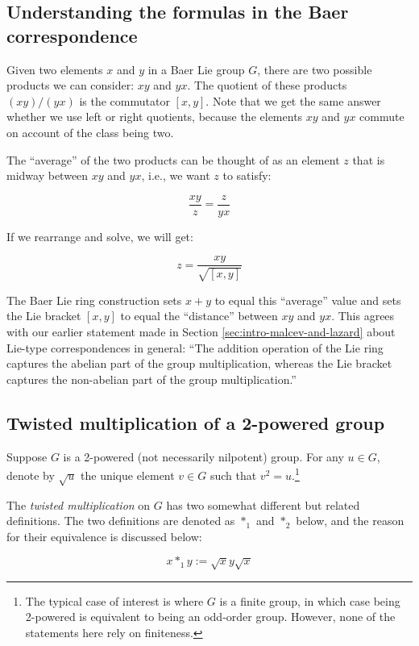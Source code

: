 \subsection{Understanding the formulas in the Baer correspondence}\label{sec:mean-deviation}

Given two elements $x$ and $y$ in a Baer Lie group $G$, there are two
possible products we can consider: $xy$ and $yx$. The quotient of
these products $(xy)/(yx)$ is the commutator $[x,y]$. Note that we get
the same answer whether we use left or right quotients, because the
elements $xy$ and $yx$ commute on account of the class being two.

The ``average'' of the two products can be thought of as an element
$z$ that is midway between $xy$ and $yx$, i.e., we want $z$ to
satisfy:

$$\frac{xy}{z} = \frac{z}{yx}$$

If we rearrange and solve, we will get:

$$z = \frac{xy}{\sqrt{[x,y]}}$$

The Baer Lie ring construction sets $x + y$ to equal this ``average''
value and sets the Lie bracket $[x,y]$ to equal the ``distance''
between $xy$ and $yx$. This agrees with our earlier statement made in
Section \ref{sec:intro-malcev-and-lazard} about Lie-type
correspondences in general: ``The addition operation of the Lie ring
captures the abelian part of the group multiplication, whereas the Lie
bracket captures the non-abelian part of the group multiplication.''

\subsection{Twisted multiplication of a 2-powered group}\label{sec:twisted-multiplication}

Suppose $G$ is a 2-powered (not necessarily nilpotent) group. For any
$u \in G$, denote by $\sqrt{u}$ the unique element $v \in G$ such that
$v^2 = u$.\footnote{The typical case of interest is where $G$ is a
  finite group, in which case being 2-powered is equivalent to being
  an odd-order group. However, none of the statements here rely on
  finiteness.}

The {\em twisted multiplication} on $G$ has two somewhat different but
related definitions. The two definitions are denoted as $*_1$ and
$*_2$ below, and the reason for their equivalence is discussed below:

$$x *_1 y := \sqrt{x}y\sqrt{x}$$

